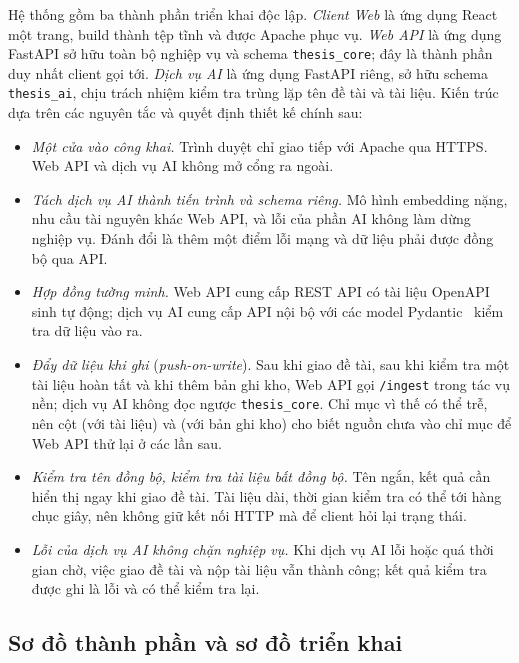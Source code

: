 \documentclass[../main.tex]{subfiles}
\begin{document}
Hệ thống gồm ba thành phần triển khai độc lập. \textit{Client Web} là ứng dụng React một trang, build thành tệp tĩnh và được Apache phục vụ. \textit{Web API} là ứng dụng FastAPI sở hữu toàn bộ nghiệp vụ và schema \texttt{thesis\_core}; đây là thành phần duy nhất client gọi tới. \textit{Dịch vụ AI} là ứng dụng FastAPI riêng, sở hữu schema \texttt{thesis\_ai}, chịu trách nhiệm kiểm tra trùng lặp tên đề tài và tài liệu. Kiến trúc dựa trên các nguyên tắc và quyết định thiết kế chính sau:
\begin{itemize}
    \item \textit{Một cửa vào công khai.} Trình duyệt chỉ giao tiếp với Apache qua HTTPS. Web API và dịch vụ AI không mở cổng ra ngoài.
    \item \textit{Tách dịch vụ AI thành tiến trình và schema riêng.} Mô hình embedding nặng, nhu cầu tài nguyên khác Web API, và lỗi của phần AI không làm dừng nghiệp vụ. Đánh đổi là thêm một điểm lỗi mạng và dữ liệu phải được đồng bộ qua API.
    \item \textit{Hợp đồng tường minh.} Web API cung cấp REST API có tài liệu OpenAPI sinh tự động; dịch vụ AI cung cấp API nội bộ với các model Pydantic~\cite{pydantic} kiểm tra dữ liệu vào ra.
    \item \textit{Đẩy dữ liệu khi ghi} (\textit{push-on-write}). Sau khi giao đề tài, sau khi kiểm tra một tài liệu hoàn tất và khi thêm bản ghi kho, Web API gọi \texttt{/ingest} trong tác vụ nền; dịch vụ AI không đọc ngược \texttt{thesis\_core}. Chỉ mục vì thế có thể trễ, nên cột  (với tài liệu) và  (với bản ghi kho) cho biết nguồn chưa vào chỉ mục để Web API thử lại ở các lần sau.
    \item \textit{Kiểm tra tên đồng bộ, kiểm tra tài liệu bất đồng bộ.} Tên ngắn, kết quả cần hiển thị ngay khi giao đề tài. Tài liệu dài, thời gian kiểm tra có thể tới hàng chục giây, nên không giữ kết nối HTTP mà để client hỏi lại trạng thái.
    \item \textit{Lỗi của dịch vụ AI không chặn nghiệp vụ.} Khi dịch vụ AI lỗi hoặc quá thời gian chờ, việc giao đề tài và nộp tài liệu vẫn thành công; kết quả kiểm tra được ghi là lỗi và có thể kiểm tra lại.
\end{itemize}

\subsection{Sơ đồ thành phần và sơ đồ triển khai}
\end{document}
